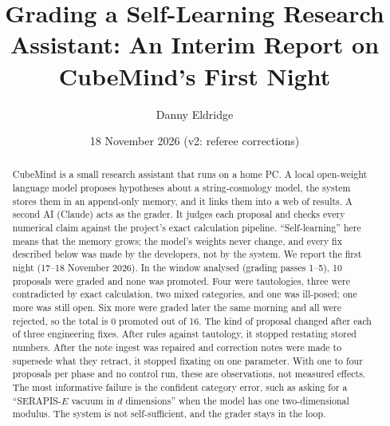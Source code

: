 \documentclass[aps,prd,twocolumn,superscriptaddress,nofootinbib,showkeys]{revtex4-2}
\begin{document}
\title{Grading a Self-Learning Research Assistant: An Interim Report on CubeMind's First Night}
\author{Danny Eldridge}
\date{18 November 2026 (v2: referee corrections)}
\begin{abstract}
CubeMind is a small research assistant that runs on a home PC. A local open-weight language model proposes hypotheses about a string-cosmology model, the system stores them in an append-only memory, and it links them into a web of results. A second AI (Claude) acts as the grader. It judges each proposal and checks every numerical claim against the project's exact calculation pipeline. ``Self-learning'' here means that the memory grows; the model's weights never change, and every fix described below was made by the developers, not by the system. We report the first night (17--18 November 2026). In the window analysed (grading passes 1--5), 10 proposals were graded and none was promoted. Four were tautologies, three were contradicted by exact calculation, two mixed categories, and one was ill-posed; one more was still open. Six more were graded later the same morning and all were rejected, so the total is 0 promoted out of 16. The kind of proposal changed after each of three engineering fixes. After rules against tautology, it stopped restating stored numbers. After the note ingest was repaired and correction notes were made to supersede what they retract, it stopped fixating on one parameter. With one to four proposals per phase and no control run, these are observations, not measured effects. The most informative failure is the confident category error, such as asking for a ``SERAPIS-$E$ vacuum in $d$ dimensions'' when the model has one two-dimensional modulus. The system is not self-sufficient, and the grader stays in the loop.
\end{abstract}
\maketitle
\end{document}
